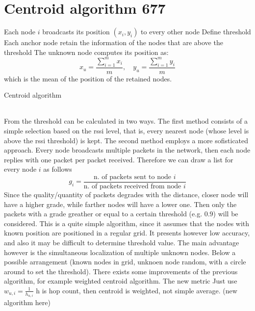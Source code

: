 \documentclass[12pt,twoside]{report}
\begin{document}
\section{Centroid algorithm 677}
\begin{algorithm}[H]
\SetAlgoLined
{}
 Each node $i$ broadcasts its position $(x_i,y_i)$ to every other node\;
 Define threshold\;
 Each anchor node retain the information of the nodes that are above the threshold\;
 The unknown node computes its position as:
 \begin{equation}
     x_u=\frac{\sum_{i=1}^mx_i}{m},\quad y_u=\frac{\sum_{i=1}^my_i}{m}
 \end{equation}
 which is the mean of the position of the retained nodes.
 \caption{Centroid algorithm}
\end{algorithm}
\noindent\\From \cite{878533} the threshold can be calculated in two ways. The first method consists of a simple selection based on the rssi level, that is, every nearest node (whose level is above the rssi threshold) is kept. The second method employs a more sofisticated approach. Every node broadcasts multiple packets in the network, then each node replies with one packet per packet received. Therefore we can draw a list for every node $i$ as follows 
\begin{equation}
    g_i = \frac{\text{n. of packets sent to node $i$}}{\text{n. of packets received from node $i$}}
\end{equation}
Since the quality/quantity of packets degrades with the distance, closer node will have a higher grade, while farther nodes will have a lower one. Then only the packets with a grade greather or equal to a certain threshold (e.g. $0.9$) will be considered. This is a quite simple algorithm, since it assumes that the nodes with known position are positioned in a regular grid. It presents however low accuracy, and also it may be difficult to determine threshold value. The main advantage however is the simultaneous localization of multiple unknown nodes. Below a possible arrangement (known nodes in grid, unknoen node random, with a circle around to set the threshold). There exists some improvements of the previous algorithm, for example weighted centroid algorithm. The new metric Just use $w_{u,i}=\frac{1}{h_{u,i}}$ h is hop count, then centroid is weighted, not simple average.
(new algorithm here)
\clearpage
\end{document}
